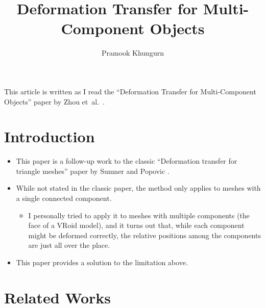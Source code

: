 \documentclass[10pt]{article}
\title{Deformation Transfer for Multi-Component Objects}
\author{Pramook Khungurn}
\newcommand{\etal}{{et~al.}}
\begin{document}
\maketitle

This article is written as I read the ``Deformation Transfer for Multi-Component Objects'' paper by Zhou \etal~\cite{Zhou:2009}.

\section{Introduction}

\begin{itemize}
    \item This paper is a follow-up work to the classic ``Deformation transfer for triangle meshes'' paper by Sumner and 
    Popovic \cite{Sumner:2004}.

    \item While not stated in the classic paper, the method only applies to meshes with a single connected component.
    \begin{itemize}
        \item I personally tried to apply it to meshes with multiple components (the face of a VRoid model), and it turns out that, while each component might be deformed correctly, the relative positions among the components are just all over the place.    
    \end{itemize}

    \item This paper provides a solution to the limitation above.
\end{itemize}

\section{Related Works}
\end{document}
